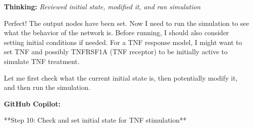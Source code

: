 \documentclass[11pt,a4paper]{article}
\begin{document}
\begin{thinkbox}
\textbf{Thinking:} \textit{Reviewed initial state, modified it, and ran simulation}

Perfect! The output nodes have been set. Now I need to run the simulation to see what the behavior of the network is. Before running, I should also consider setting initial conditions if needed. For a TNF response model, I might want to set TNF and possibly TNFRSF1A (TNF receptor) to be initially active to simulate TNF treatment.

Let me first check what the current initial state is, then potentially modify it, and then run the simulation.

\end{thinkbox}
\begin{copilotbox}
\textbf{GitHub Copilot:}

**Step 10: Check and set initial state for TNF stimulation**

\end{copilotbox}
\end{document}
